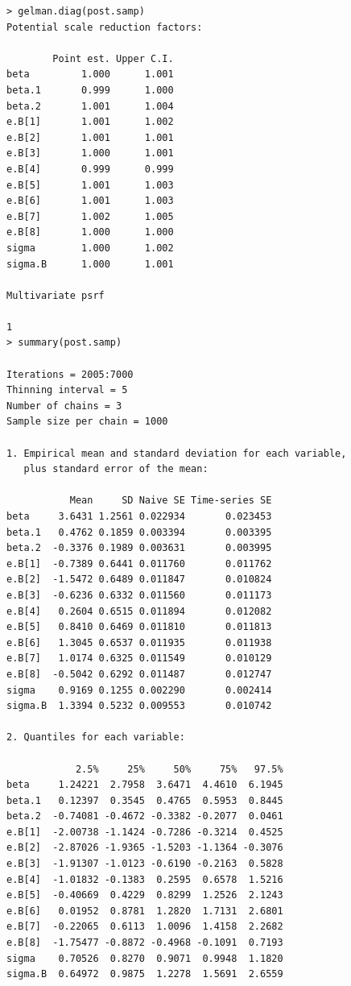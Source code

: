 \documentclass[11pt,uplatex]{jsarticle}
\begin{document}
\begin{lstlisting}
> gelman.diag(post.samp)
Potential scale reduction factors:

        Point est. Upper C.I.
beta         1.000      1.001
beta.1       0.999      1.000
beta.2       1.001      1.004
e.B[1]       1.001      1.002
e.B[2]       1.001      1.001
e.B[3]       1.000      1.001
e.B[4]       0.999      0.999
e.B[5]       1.001      1.003
e.B[6]       1.001      1.003
e.B[7]       1.002      1.005
e.B[8]       1.000      1.000
sigma        1.000      1.002
sigma.B      1.000      1.001

Multivariate psrf

1
> summary(post.samp)

Iterations = 2005:7000
Thinning interval = 5 
Number of chains = 3 
Sample size per chain = 1000 

1. Empirical mean and standard deviation for each variable,
   plus standard error of the mean:

           Mean     SD Naive SE Time-series SE
beta     3.6431 1.2561 0.022934       0.023453
beta.1   0.4762 0.1859 0.003394       0.003395
beta.2  -0.3376 0.1989 0.003631       0.003995
e.B[1]  -0.7389 0.6441 0.011760       0.011762
e.B[2]  -1.5472 0.6489 0.011847       0.010824
e.B[3]  -0.6236 0.6332 0.011560       0.011173
e.B[4]   0.2604 0.6515 0.011894       0.012082
e.B[5]   0.8410 0.6469 0.011810       0.011813
e.B[6]   1.3045 0.6537 0.011935       0.011938
e.B[7]   1.0174 0.6325 0.011549       0.010129
e.B[8]  -0.5042 0.6292 0.011487       0.012747
sigma    0.9169 0.1255 0.002290       0.002414
sigma.B  1.3394 0.5232 0.009553       0.010742

2. Quantiles for each variable:

            2.5%     25%     50%     75%   97.5%
beta     1.24221  2.7958  3.6471  4.4610  6.1945
beta.1   0.12397  0.3545  0.4765  0.5953  0.8445
beta.2  -0.74081 -0.4672 -0.3382 -0.2077  0.0461
e.B[1]  -2.00738 -1.1424 -0.7286 -0.3214  0.4525
e.B[2]  -2.87026 -1.9365 -1.5203 -1.1364 -0.3076
e.B[3]  -1.91307 -1.0123 -0.6190 -0.2163  0.5828
e.B[4]  -1.01832 -0.1383  0.2595  0.6578  1.5216
e.B[5]  -0.40669  0.4229  0.8299  1.2526  2.1243
e.B[6]   0.01952  0.8781  1.2820  1.7131  2.6801
e.B[7]  -0.22065  0.6113  1.0096  1.4158  2.2682
e.B[8]  -1.75477 -0.8872 -0.4968 -0.1091  0.7193
sigma    0.70526  0.8270  0.9071  0.9948  1.1820
sigma.B  0.64972  0.9875  1.2278  1.5691  2.6559

\end{lstlisting}
\end{document}
